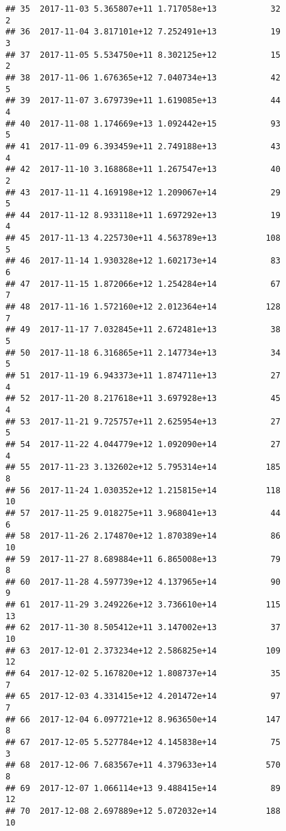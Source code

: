 \documentclass[]{article}
\begin{document}
\begin{verbatim}
## 35  2017-11-03 5.365807e+11 1.717058e+13           32               2
## 36  2017-11-04 3.817101e+12 7.252491e+13           19               3
## 37  2017-11-05 5.534750e+11 8.302125e+12           15               2
## 38  2017-11-06 1.676365e+12 7.040734e+13           42               5
## 39  2017-11-07 3.679739e+11 1.619085e+13           44               4
## 40  2017-11-08 1.174669e+13 1.092442e+15           93               5
## 41  2017-11-09 6.393459e+11 2.749188e+13           43               4
## 42  2017-11-10 3.168868e+11 1.267547e+13           40               2
## 43  2017-11-11 4.169198e+12 1.209067e+14           29               5
## 44  2017-11-12 8.933118e+11 1.697292e+13           19               4
## 45  2017-11-13 4.225730e+11 4.563789e+13          108               5
## 46  2017-11-14 1.930328e+12 1.602173e+14           83               6
## 47  2017-11-15 1.872066e+12 1.254284e+14           67               7
## 48  2017-11-16 1.572160e+12 2.012364e+14          128               7
## 49  2017-11-17 7.032845e+11 2.672481e+13           38               5
## 50  2017-11-18 6.316865e+11 2.147734e+13           34               5
## 51  2017-11-19 6.943373e+11 1.874711e+13           27               4
## 52  2017-11-20 8.217618e+11 3.697928e+13           45               4
## 53  2017-11-21 9.725757e+11 2.625954e+13           27               5
## 54  2017-11-22 4.044779e+12 1.092090e+14           27               4
## 55  2017-11-23 3.132602e+12 5.795314e+14          185               8
## 56  2017-11-24 1.030352e+12 1.215815e+14          118              10
## 57  2017-11-25 9.018275e+11 3.968041e+13           44               6
## 58  2017-11-26 2.174870e+12 1.870389e+14           86              10
## 59  2017-11-27 8.689884e+11 6.865008e+13           79               8
## 60  2017-11-28 4.597739e+12 4.137965e+14           90               9
## 61  2017-11-29 3.249226e+12 3.736610e+14          115              13
## 62  2017-11-30 8.505412e+11 3.147002e+13           37              10
## 63  2017-12-01 2.373234e+12 2.586825e+14          109              12
## 64  2017-12-02 5.167820e+12 1.808737e+14           35               7
## 65  2017-12-03 4.331415e+12 4.201472e+14           97               7
## 66  2017-12-04 6.097721e+12 8.963650e+14          147               8
## 67  2017-12-05 5.527784e+12 4.145838e+14           75               3
## 68  2017-12-06 7.683567e+11 4.379633e+14          570               8
## 69  2017-12-07 1.066114e+13 9.488415e+14           89              12
## 70  2017-12-08 2.697889e+12 5.072032e+14          188              10

\end{verbatim}
\end{document}
